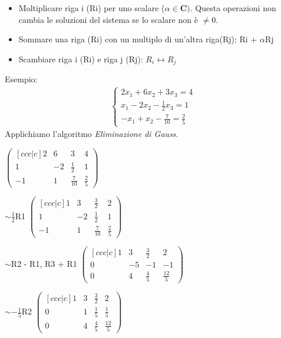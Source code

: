 \documentclass[12pt]{article}
\begin{document}
\begin{itemize}
    \item Moltiplicare riga i (Ri) per uno scalare ($\alpha \in \mathbf{C})$. Questa operazioni non cambia le soluzioni del sistema se lo scalare non è $\neq 0$.
    \item Sommare una riga (Ri) con un multiplo di un'altra riga(Rj): Ri + $\alpha$Rj
    \item Scambiare riga i (Ri) e riga j (Rj): $R_i \longleftrightarrow R_j$
\end{itemize}
Esempio:
\begin{align*}
  \begin{cases}
    2x_1 + 6x_2 + 3x_3 = 4\\
    x_1 - 2x_2 - \frac{1}{2}x_3 = 1\\
    -x_1 + x_2 - \frac{7}{10} = \frac{2}{5}
  \end{cases}
\end{align*}
Applichiamo l'algoritmo \textit{Eliminazione di Gauss}.
\begin{center}
$\begin{pmatrix}[ccc|c]
  2 & 6 & 3 & 4\\
  1 & -2 & \frac{1}{2} & 1\\
  -1 & 1 & \frac{7}{10} & \frac{2}{5}
\end{pmatrix}$
\end{center}

\begin{center}
$\sim \frac{1}{2}$R1
$\begin{pmatrix}[ccc|c]
  1 & 3 & \frac{3}{2} & 2\\
  1 & -2 & \frac{1}{2} & 1\\
  -1 & 1 & \frac{7}{10} & \frac{2}{5}
\end{pmatrix}$
\end{center}

\begin{center}
$\sim $R2 - R1, R3 + R1
$\begin{pmatrix}[ccc|c]
  1 & 3 & \frac{3}{2} & 2\\
  0 & -5 & -1 & -1\\
  0 & 4 & \frac{4}{5} & \frac{12}{5}
\end{pmatrix}$
\end{center}

\begin{center}
$\sim -\frac{1}{5}$R2
$\begin{pmatrix}[ccc|c]
  1 & 3 & \frac{3}{2} & 2\\
  0 & 1 & \frac{1}{5} & \frac{1}{5}\\
  0 & 4 & \frac{4}{5} & \frac{12}{5}
\end{pmatrix}$
\end{center}
\end{document}

